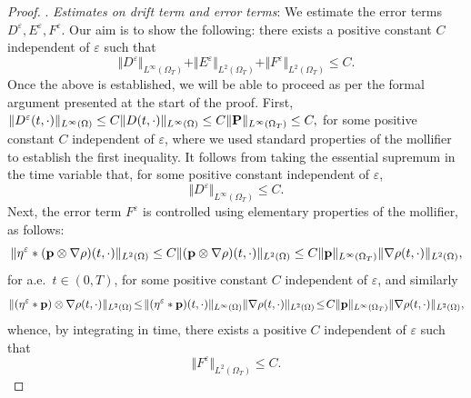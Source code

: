 \documentclass[10pt,a4paper]{amsart}
\renewcommand{\P}{{\bf P}}
\newcommand{\p}{{\bf p}}
\begin{document}
\begin{proof}
    \smallskip 

    . \textit{Estimates on drift term and error terms}: We estimate the error terms $D^\varepsilon, E^\varepsilon, F^\varepsilon$. Our aim is to show the following: there exists a positive constant $C$ independent of $\varepsilon$ such that 
    \begin{equation}\label{eq:unif bounds for H1 for p with mollifications}
        \Vert D^\varepsilon \Vert_{L^\infty(\Omega_T)} + \Vert E^\varepsilon \Vert_{L^2(\Omega_T)} + \Vert F^\varepsilon \Vert_{L^2(\Omega_T)} \leq C. 
    \end{equation}
    Once the above is established, we will be able to proceed as per the formal argument presented at the start of the proof. First, $\Vert D^\varepsilon (t,\cdot) \Vert_{L^\infty(\Omega)} \leq C \Vert D(t,\cdot) \Vert_{L^\infty(\Omega)} \leq C \Vert \P \Vert_{L^\infty(\Omega_T)} \leq C,$ for some positive constant $C$ independent of $\varepsilon$, where we used standard properties of the mollifier to establish the first inequality. It follows from taking the essential supremum in the time variable that, for some positive constant independent of $\varepsilon$, 
    \begin{equation}\label{eq:first error term H1 proof p}
        \Vert D^\varepsilon \Vert_{L^\infty(\Omega_T)} \leq C. 
    \end{equation}
Next, the error term $F^\varepsilon$ is controlled using elementary properties of the mollifier, as follows: 
\begin{equation*}
    \Vert \eta^\varepsilon*(\p \otimes \nabla \rho)(t,\cdot) \Vert_{L^2(\Omega)} \leq C \Vert (\p \otimes \nabla \rho) (t,\cdot) \Vert_{L^2(\Omega)} \leq C \Vert \p \Vert_{L^\infty(\Omega_T)} \Vert \nabla \rho(t,\cdot) \Vert_{L^2(\Omega)}, 
\end{equation*}
for a.e.~$t \in(0,T)$, for some positive constant $C$ independent of $\varepsilon$, and similarly 
\begin{equation*}
    \Vert (\eta^\varepsilon*\p )\otimes \nabla \rho (t,\cdot) \Vert_{L^2(\Omega)} \!\leq\! \Vert (\eta^\varepsilon*\p )(t,\cdot) \Vert_{L^\infty(\Omega)}\Vert \nabla \rho(t,\cdot) \Vert_{L^2(\Omega)} \!\leq\! C \Vert \p \Vert_{L^\infty(\Omega_T)} \Vert \nabla \rho(t,\cdot) \Vert_{L^2(\Omega)}, 
\end{equation*}
whence, by integrating in time, there exists a positive $C$ independent of $\varepsilon$ such that 
\begin{equation}\label{eq:second error term H1 proof p}
    \Vert F^\varepsilon \Vert_{L^2(\Omega_T)} \leq C. 

\end{equation}
\end{proof}
\end{document}
